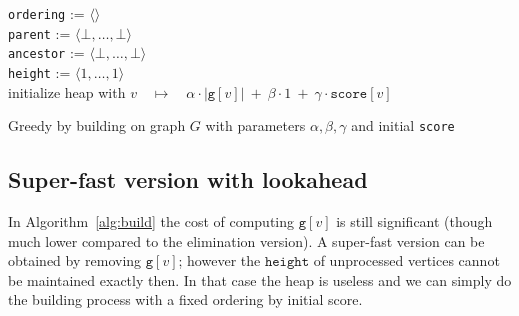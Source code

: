 \documentclass{timgad}
\begin{document}
\begin{algorithm}[h]
 \texttt{ordering} := $\langle\rangle$\\
 \texttt{parent} := $\langle\bot,\dots,\bot\rangle$\\ 
 \texttt{ancestor} := $\langle\bot,\dots,\bot\rangle$\\  
 \texttt{height} := $\langle 1,\dots,1\rangle$\\ 
 initialize heap with $v \quad \mapsto \quad \alpha \cdot |\texttt{g}[v]|\ +\ \beta \cdot 1\ +\ \gamma \cdot \texttt{score}[v]$\\
 \caption{Greedy by building on graph $G$ with parameters $\alpha,\beta,\gamma$ and initial \texttt{score}\hspace*{-2em}}
 \label{alg:build}
\end{algorithm}

\subsection{Super-fast version with lookahead}
In Algorithm~\ref{alg:build}  the cost of computing $\texttt{g}[v]$ is still significant (though much lower compared to the elimination version).
A super-fast version can be obtained by removing $\texttt{g}[v]$; however the $\texttt{height}$ of unprocessed vertices cannot be maintained exactly then.
In that case the heap is useless and we can simply do the building process with a fixed ordering by initial score.
\end{document}
